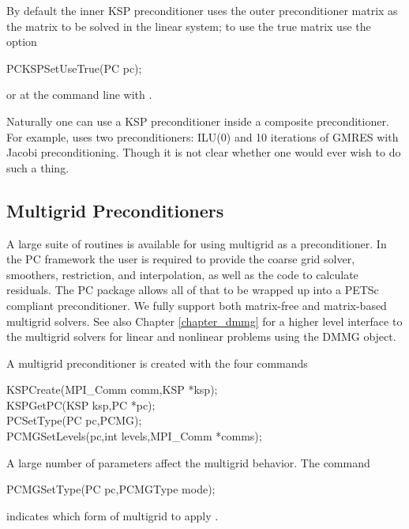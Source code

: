By default the inner KSP preconditioner uses the outer preconditioner matrix 
as the matrix to be solved in the linear system; to use the true matrix use the 
option 
\begin{tabbing}
  PCKSPSetUseTrue(PC pc);
\end{tabbing}
or at the command line with . 

Naturally one can use a KSP preconditioner inside a composite preconditioner. For example,
uses two preconditioners: ILU(0) and 10 iterations of GMRES with Jacobi preconditioning. Though
it is not clear whether one would ever wish to do such a thing.

\subsection{Multigrid Preconditioners}  \label{sec_mg}

A large suite of routines is available for using multigrid as a
preconditioner. In the PC framework the user is required to provide 
the coarse grid solver, smoothers, restriction, and interpolation, 
as well as the code to calculate residuals. The PC package
allows all of that to be wrapped up into a PETSc compliant preconditioner. 
We fully support both matrix-free and matrix-based multigrid solvers. 
See also Chapter \ref{chapter_dmmg} for a higher level
interface to the multigrid solvers for linear and nonlinear problems using the DMMG object.

A multigrid preconditioner is created with the four commands 
\begin{tabbing}
  KSPCreate(MPI\_Comm comm,KSP *ksp);\\
  KSPGetPC(KSP ksp,PC *pc);\\
  PCSetType(PC pc,PCMG);\\
  PCMGSetLevels(pc,int levels,MPI\_Comm *comms);
\end{tabbing}
A
large number of parameters affect the multigrid behavior. The command
\begin{tabbing}
  PCMGSetType(PC pc,PCMGType mode); 
\end{tabbing}
indicates which form of multigrid to apply \cite{1sbg}. 
  

